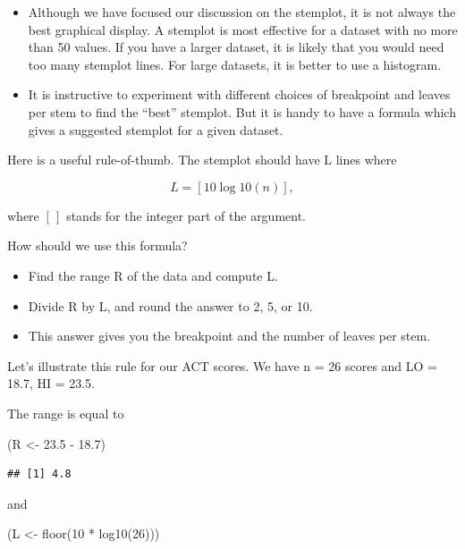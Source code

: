 \documentclass[
]{book}
\newenvironment{Shaded}{\begin{snugshade}}{\end{snugshade}}
\newcommand{\DecValTok}[1]{\textcolor[rgb]{0.00,0.00,0.81}{#1}}
\newcommand{\FloatTok}[1]{\textcolor[rgb]{0.00,0.00,0.81}{#1}}
\newcommand{\FunctionTok}[1]{\textcolor[rgb]{0.00,0.00,0.00}{#1}}
\newcommand{\NormalTok}[1]{#1}
\newcommand{\OtherTok}[1]{\textcolor[rgb]{0.56,0.35,0.01}{#1}}
\newcommand{\SpecialCharTok}[1]{\textcolor[rgb]{0.00,0.00,0.00}{#1}}
\providecommand{\tightlist}{%
  \setlength{\itemsep}{0pt}\setlength{\parskip}{0pt}}
\begin{document}
\begin{itemize}
\item
  Although we have focused our discussion on the stemplot, it is not always the best graphical display. A stemplot is most effective for a dataset with no more than 50 values. If you have a larger dataset, it is likely that you would need too many stemplot lines. For large datasets, it is better to use a histogram.
\item
  It is instructive to experiment with different choices of breakpoint and leaves per stem to find the ``best'' stemplot. But it is handy to have a formula which gives a suggested stemplot for a given dataset.
\end{itemize}

Here is a useful rule-of-thumb. The stemplot should have L lines where

\[
L = [10 \log10(n)],
\]

where \([ \, ]\) stands for the integer part of the argument.

How should we use this formula?

\begin{itemize}
\tightlist
\item
  Find the range R of the data and compute L.
\item
  Divide R by L, and round the answer to 2, 5, or 10.
\item
  This answer gives you the breakpoint and the number of leaves per stem.
\end{itemize}

Let's illustrate this rule for our ACT scores. We have n = 26 scores and LO = 18.7, HI = 23.5.

The range is equal to

\begin{Shaded}
\begin{Highlighting}[]
\NormalTok{(R }\OtherTok{\textless{}{-}} \FloatTok{23.5} \SpecialCharTok{{-}} \FloatTok{18.7}\NormalTok{)}
\end{Highlighting}
\end{Shaded}

\begin{verbatim}
## [1] 4.8
\end{verbatim}

and

\begin{Shaded}
\begin{Highlighting}[]
\NormalTok{(L }\OtherTok{\textless{}{-}} \FunctionTok{floor}\NormalTok{(}\DecValTok{10} \SpecialCharTok{*} \FunctionTok{log10}\NormalTok{(}\DecValTok{26}\NormalTok{)))}
\end{Highlighting}
\end{Shaded}
\end{document}
